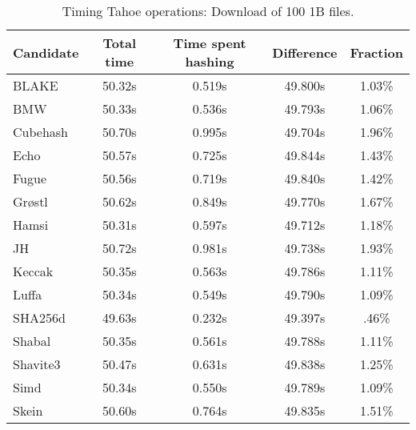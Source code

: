 \begin{table}[h]
  \centering
  \begin{tabular}{ | l | c | c | c | c | }
    \hline
    Candidate & Total time & Time spent hashing & Difference & Fraction \\ \hline
    BLAKE     &  50.32s  &  0.519s  &  49.800s  &  1.03\%  \\  \hline
    BMW       &  50.33s  &  0.536s  &  49.793s  &  1.06\%  \\  \hline
    Cubehash  &  50.70s  &  0.995s  &  49.704s  &  1.96\%  \\  \hline
    Echo      &  50.57s  &  0.725s  &  49.844s  &  1.43\%  \\  \hline
    Fugue     &  50.56s  &  0.719s  &  49.840s  &  1.42\%  \\  \hline
    Grøstl    &  50.62s  &  0.849s  &  49.770s  &  1.67\%  \\  \hline
    Hamsi     &  50.31s  &  0.597s  &  49.712s  &  1.18\%  \\  \hline
    JH        &  50.72s  &  0.981s  &  49.738s  &  1.93\%  \\  \hline
    Keccak    &  50.35s  &  0.563s  &  49.786s  &  1.11\%  \\  \hline
    Luffa     &  50.34s  &  0.549s  &  49.790s  &  1.09\%  \\  \hline
    SHA256d   &  49.63s  &  0.232s  &  49.397s  &  .46\%   \\  \hline
    Shabal    &  50.35s  &  0.561s  &  49.788s  &  1.11\%  \\  \hline
    Shavite3  &  50.47s  &  0.631s  &  49.838s  &  1.25\%  \\  \hline
    Simd      &  50.34s  &  0.550s  &  49.789s  &  1.09\%  \\  \hline
    Skein     &  50.60s  &  0.764s  &  49.835s  &  1.51\%  \\  \hline
  \end{tabular}
  \caption{Timing Tahoe operations: Download of 100 1B files.}
  \label{tbl:hashingtimes:get1b}
\end{table}
